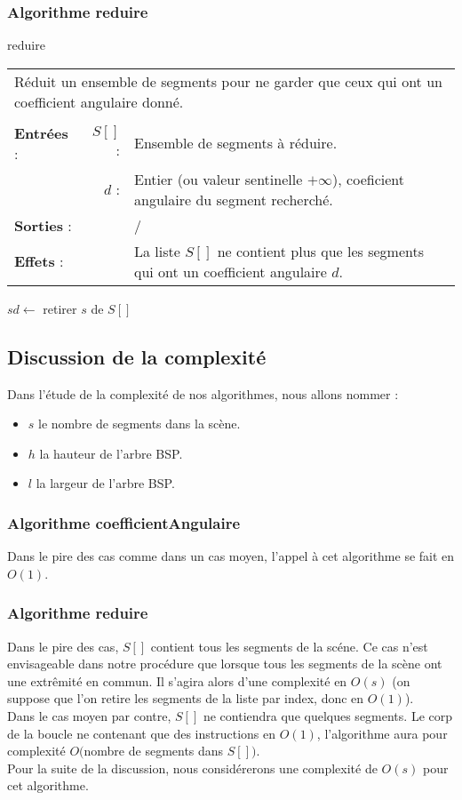 \documentclass[10pt]{article}
\begin{document}
\subsubsection{Algorithme reduire}
\begin{algorithm}[H]
\caption{reduire}
\begin{tabular}{lrl}
\multicolumn{3}{l}{Réduit un ensemble de segments pour ne garder que ceux qui ont un coefficient angulaire donné.}\\
&&\\
\textbf{Entrées} : &$S[]$ : &Ensemble de segments à réduire.\\
& $d$ : &Entier (ou valeur sentinelle $+\infty$), coeficient angulaire du segment recherché.\\
\textbf{Sorties} :& &/\\
\textbf{Effets} :& &La liste $S[]$ ne contient plus que les segments qui ont un coefficient angulaire $d$.
\end{tabular}
\begin{algorithmic}[1]
\State $sd\gets$
\State retirer $s$ de $S[]$
\EndIf
\EndFor
\EndProcedure
\end{algorithmic}
\end{algorithm}

\newpage
\subsection{Discussion de la complexité}
Dans l'étude de la complexité de nos algorithmes, nous allons nommer :
\begin{itemize}
\item $s$ le nombre de segments dans la scène.
\item $h$ la hauteur de l'arbre BSP.
\item $l$ la largeur de l'arbre BSP.
\end{itemize}
\subsubsection{Algorithme coefficientAngulaire}
Dans le pire des cas comme dans un cas moyen, l'appel à cet algorithme se fait en $O(1)$.
\subsubsection{Algorithme reduire}
Dans le pire des cas, $S[]$ contient tous les segments de la scéne. Ce cas n'est envisageable dans notre procédure que lorsque tous les segments de la scène ont une extrêmité en commun. Il s'agira alors d'une complexité en $O(s)$ (on suppose que l'on retire les segments de la liste par index, donc en $O(1)$).\\[.5cm]
Dans le cas moyen par contre, $S[]$ ne contiendra que quelques segments. Le corp de la boucle ne contenant que des instructions en $O(1)$, l'algorithme aura pour complexité $O($nombre de segments dans $S[])$.\\[.5cm]
Pour la suite de la discussion, nous considérerons une complexité de $O(s)$ pour cet algorithme.
\end{document}
